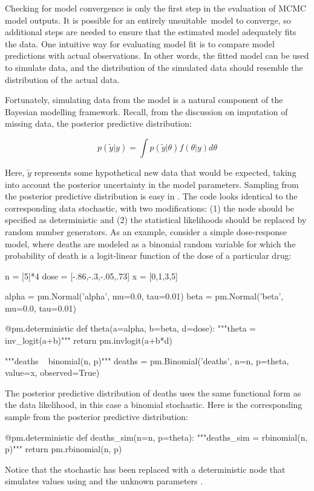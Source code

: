 \documentclass[]{jss}
\begin{document}
Checking for model convergence is only the first step in the evaluation of MCMC model outputs. It is possible for an entirely unsuitable~model to converge, so additional steps are needed to ensure that the estimated model adequately fits the data. One intuitive way for evaluating model fit is to compare model predictions with actual observations. In other words, the fitted model can be used to simulate data, and the distribution of the simulated data should resemble the distribution of the actual data.

Fortunately, simulating data from the model is a natural component of the Bayesian modelling framework. Recall, from the discussion on imputation of missing data, the posterior predictive distribution:

\begin{equation}
  p(\tilde{y}|y) = \int p(\tilde{y}|\theta) f(\theta|y) d\theta
\end{equation}

Here, $\tilde{y}$ represents some hypothetical new data that would be expected, taking into account the posterior uncertainty in the model parameters. Sampling from the posterior predictive distribution is easy in . The code looks identical to the corresponding data stochastic, with two modifications: (1) the node should be specified as deterministic and (2) the statistical likelihoods should be replaced by random number generators. As an example, consider a simple dose-response model, where deaths are modeled as a binomial random variable for which the probability of death is a logit-linear function of the dose of a particular drug:
\begin{CodeInput}
n = [5]*4
dose = [-.86,-.3,-.05,.73]
x = [0,1,3,5]

alpha = pm.Normal('alpha', mu=0.0, tau=0.01)
beta = pm.Normal('beta', mu=0.0, tau=0.01)

@pm.deterministic
def theta(a=alpha, b=beta, d=dose):
    """theta = inv_logit(a+b)"""
    return pm.invlogit(a+b*d)

"""deaths ~ binomial(n, p)"""
deaths = pm.Binomial('deaths', n=n, p=theta, value=x, observed=True)
\end{CodeInput}
The posterior predictive distribution of deaths uses the same functional form as the data likelihood, in this case a binomial stochastic. Here is the corresponding sample from the posterior predictive distribution:
\begin{CodeInput}
@pm.deterministic
def deaths_sim(n=n, p=theta):
    """deaths_sim = rbinomial(n, p)"""
    return pm.rbinomial(n, p)
\end{CodeInput}
Notice that the stochastic  has been replaced with a deterministic node that simulates values using  and the unknown parameters . 
\end{document}

